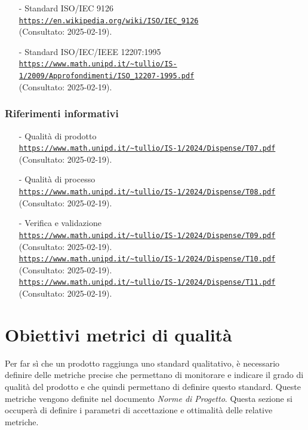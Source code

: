 \documentclass[10pt]{article}
\begin{document}
\begin{justify}
\begin{itemize}
    \item[-] Standard ISO/IEC 9126 \label{ISO 9126} \\
    \textcolor{blue}{\texttt{\url{https://en.wikipedia.org/wiki/ISO/IEC_9126}}}\\
    (Consultato: 2025-02-19).
    \item[-] Standard ISO/IEC/IEEE 12207:1995 \label{ISO 12207:1995}\\
    \textcolor{blue}{\texttt{\url{https://www.math.unipd.it/~tullio/IS-1/2009/Approfondimenti/ISO_12207-1995.pdf}}}\\
    (Consultato: 2025-02-19).

\end{itemize}
\subsubsection{Riferimenti informativi}
\begin{itemize}
    \item[-] Qualità di prodotto\\
    \textcolor{blue}{\texttt{\url{https://www.math.unipd.it/~tullio/IS-1/2024/Dispense/T07.pdf}}}\\
    (Consultato: 2025-02-19).
    \item[-] Qualità di processo\\
    \textcolor{blue}{\texttt{\url{https://www.math.unipd.it/~tullio/IS-1/2024/Dispense/T08.pdf}}}\\
    (Consultato: 2025-02-19).
    \item[-] Verifica e validazione\\
    \textcolor{blue}{\texttt{\url{https://www.math.unipd.it/~tullio/IS-1/2024/Dispense/T09.pdf}}}\\
    (Consultato: 2025-02-19).\\
    \textcolor{blue}{\texttt{\url{https://www.math.unipd.it/~tullio/IS-1/2024/Dispense/T10.pdf}}}\\
    (Consultato: 2025-02-19).\\
    \textcolor{blue}{\texttt{\url{https://www.math.unipd.it/~tullio/IS-1/2024/Dispense/T11.pdf}}}\\
    (Consultato: 2025-02-19).
\end{itemize}
\newpage

\section{Obiettivi metrici di qualità}
Per far sì che un prodotto raggiunga uno standard qualitativo, è necessario definire delle metriche precise che permettano di monitorare e indicare il grado di qualità del prodotto e che quindi permettano di definire questo standard.
Queste metriche vengono definite nel documento \textit{Norme di Progetto}.
Questa sezione si occuperà di definire i parametri di accettazione e ottimalità delle relative metriche.\\


\end{justify}
\end{document}
